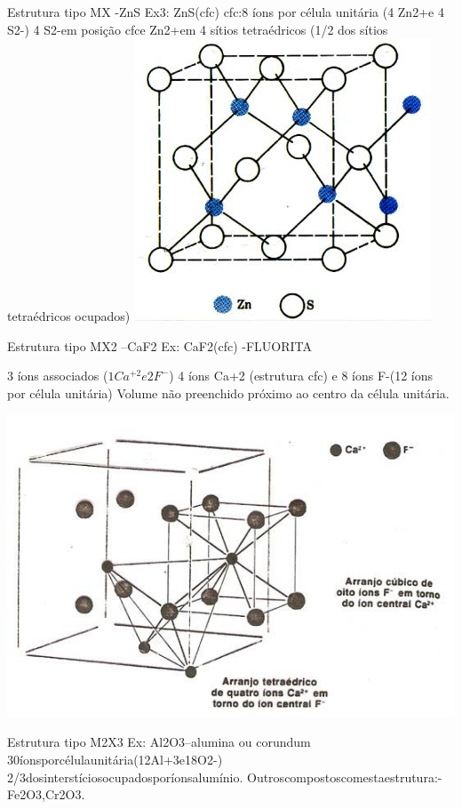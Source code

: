  

Estrutura tipo MX -ZnS
Ex3: ZnS(cfc)
cfc:8 íons por célula unitária (4 Zn2+e 4 S2-)
4 S2-em posição cfce Zn2+em 4 sítios tetraédricos
(1/2 dos sítios tetraédricos ocupados)
 \includegraphics[scale=0.5,trim={0 0 0 0}]{figures/ZnS}


 Estrutura tipo MX2 –CaF2
 Ex: CaF2(cfc) -FLUORITA
 
3 íons associados ($1Ca^{+2} e 2F^{-}$)
4 íons Ca+2 (estrutura cfc) e 8 íons F-(12 íons por célula unitária)
Volume não preenchido próximo ao centro da célula unitária.

\includegraphics[scale=0.5,trim={0 0 0 0}]{figures/CaF2}

Estrutura tipo M2X3
Ex: Al2O3–alumina ou corundum
30íonsporcélulaunitária(12Al+3e18O2-)
2/3dosinterstíciosocupadosporíonsalumínio.
Outroscompostoscomestaestrutura:-Fe2O3,Cr2O3.
  
